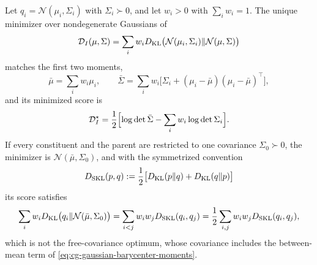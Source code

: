 Let \(q_i=\mathcal N(\mu_i,\Sigma_i)\) with \(\Sigma_i\succ0\), and let
\(w_i>0\) with \(\sum_iw_i=1\). The unique minimizer over nondegenerate
Gaussians of
\begin{equation}
\mathcal D_I(\mu,\Sigma)
=\sum_i w_iD_{\mathrm{KL}}\bigl(\mathcal N(\mu_i,\Sigma_i)\Vert\mathcal N(\mu,\Sigma)\bigr)
\label{eq:cg-gaussian-barycenter-objective}
\end{equation}
matches the first two moments,
\begin{equation}
\bar\mu=\sum_i w_i\mu_i,\qquad
\bar\Sigma=\sum_i w_i\bigl[\Sigma_i+(\mu_i-\bar\mu)(\mu_i-\bar\mu)^\top\bigr],
\label{eq:cg-gaussian-barycenter-moments}
\end{equation}
and its minimized score is
\begin{equation}
\mathcal D_I^\star
=\frac12\Bigl[
\log\det\bar\Sigma-\sum_i w_i\log\det\Sigma_i
\Bigr].
\label{eq:cg-gaussian-barycenter-score}
\end{equation}
If every constituent and the parent are restricted to one covariance
\(\Sigma_0\succ0\), the minimizer is \(\mathcal N(\bar\mu,\Sigma_0)\), and with
the symmetrized convention
\begin{equation}
D_{\mathrm{SKL}}(p,q)
:=\frac12\bigl[D_{\mathrm{KL}}(p\Vert q)+D_{\mathrm{KL}}(q\Vert p)\bigr]
\label{eq:cg-symmetric-kl-convention}
\end{equation}
its score satisfies
\begin{equation}
\sum_i w_iD_{\mathrm{KL}}\bigl(q_i\Vert\mathcal N(\bar\mu,\Sigma_0)\bigr)
=\sum_{i<j}w_iw_jD_{\mathrm{SKL}}(q_i,q_j)
=\frac12\sum_{i,j}w_iw_jD_{\mathrm{SKL}}(q_i,q_j),
\label{eq:cg-fixed-covariance-pairwise-identity}
\end{equation}
which is not the free-covariance optimum, whose covariance includes the
between-mean term of \eqref{eq:cg-gaussian-barycenter-moments}.

